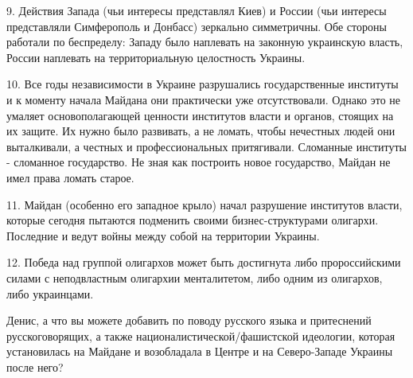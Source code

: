 \begin{itemize}
9. Действия Запада (чьи интересы представлял Киев) и России (чьи интересы
представляли Симферополь и Донбасс) зеркально симметричны. Обе стороны работали
по беспределу: Западу было наплевать на законную украинскую власть, России
наплевать на территориальную целостность Украины.

10. Все годы независимости в Украине разрушались государственные институты и к
моменту начала Майдана они практически уже отсутствовали. Однако это не умаляет
основополагающей ценности институтов власти и органов, стоящих на их защите. Их
нужно было развивать, а не ломать, чтобы нечестных людей они выталкивали, а
честных и профессиональных притягивали. Сломанные институты - сломанное
государство. Не зная как построить новое государство, Майдан не имел права
ломать старое.

11. Майдан (особенно его западное крыло) начал разрушение институтов власти,
которые сегодня пытаются подменить своими бизнес-структурами олигархи.
Последние и ведут войны между собой на территории Украины.

12. Победа над группой олигархов может быть достигнута либо пророссийскими
силами с неподвластным олигархии менталитетом, либо одним из олигархов, либо
украинцами.

Денис, а что вы можете добавить по поводу русского языка и притеснений
русскоговорящих, а также националистической/фашистской идеологии, которая
установилась на Майдане и возобладала в Центре и на Северо-Западе Украины после
него?

\end{itemize} %
